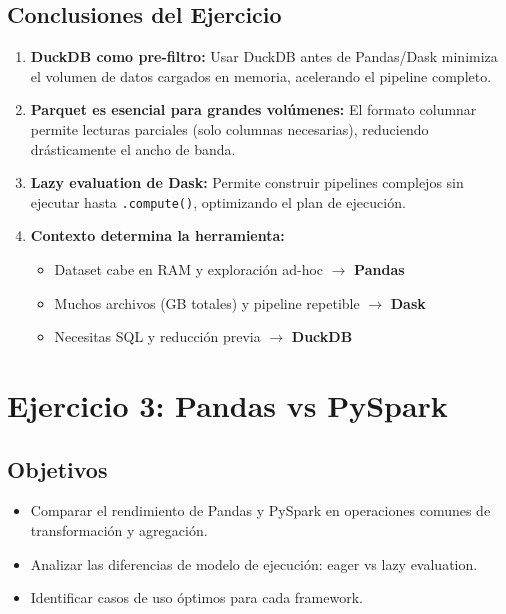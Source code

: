 \documentclass[12pt]{src/formato_utem}
\begin{document}
\subsection{Conclusiones del Ejercicio}

\begin{enumerate}
    \item \textbf{DuckDB como pre-filtro:} Usar DuckDB antes de Pandas/Dask minimiza el volumen de datos cargados en memoria, acelerando el pipeline completo.
    
    \item \textbf{Parquet es esencial para grandes volúmenes:} El formato columnar permite lecturas parciales (solo columnas necesarias), reduciendo drásticamente el ancho de banda.
    
    \item \textbf{Lazy evaluation de Dask:} Permite construir pipelines complejos sin ejecutar hasta \texttt{.compute()}, optimizando el plan de ejecución.
    
    \item \textbf{Contexto determina la herramienta:}
    \begin{itemize}
        \item Dataset cabe en RAM y exploración ad-hoc $\rightarrow$ \textbf{Pandas}
        \item Muchos archivos (GB totales) y pipeline repetible $\rightarrow$ \textbf{Dask}
        \item Necesitas SQL y reducción previa $\rightarrow$ \textbf{DuckDB}
    \end{itemize}
\end{enumerate}

\newpage

\section{Ejercicio 3: Pandas vs PySpark}

\subsection{Objetivos}

\begin{itemize}
    \item Comparar el rendimiento de Pandas y PySpark en operaciones comunes de transformación y agregación.
    \item Analizar las diferencias de modelo de ejecución: eager vs lazy evaluation.
    \item Identificar casos de uso óptimos para cada framework.
\end{itemize}
\end{document}

